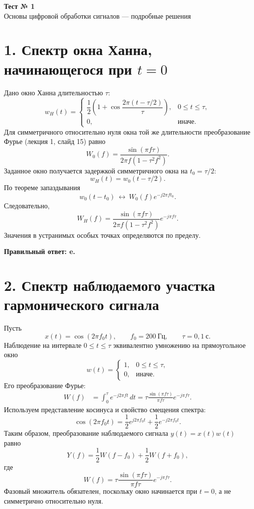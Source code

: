\documentclass[12pt,a4paper]{article}
\begin{document}
\begin{center}
{\Huge\bfseries Тест № 1}\\[8pt]
{\large Основы цифровой обработки сигналов — подробные решения}
\end{center}
\vspace{8mm}
\section*{1. Спектр окна Ханна, начинающегося при $t=0$}
Дано окно Ханна длительностью $\tau$:
\[
w_H(t)=\begin{cases}
\dfrac12\left(1+\cos\dfrac{2\pi(t-\tau/2)}{\tau}\right),&0\leq t\leq\tau,\\[5pt]
0,&\text{иначе}.
\end{cases}
\]
Для симметричного относительно нуля окна той же длительности преобразование Фурье (лекция 1, слайд 15) равно
\[
W_0(f)=\frac{\sin(\pi f\tau)}{2\pi f(1-\tau^2 f^2)}.
\]
Заданное окно получается задержкой симметричного окна на $t_0=\tau/2$:
\[
w_H(t)=w_0(t-\tau/2).
\]
По теореме запаздывания
\[
w_0(t-t_0)\ \longleftrightarrow\ W_0(f)e^{-j2\pi f t_0}.
\]
Следовательно,
\[
\boxed{W_H(f)=\frac{\sin(\pi f\tau)}{2\pi f(1-\tau^2f^2)}e^{-j\pi f\tau}.}
\]
Значения в устранимых особых точках определяются по пределу.

\noindent\textbf{Правильный ответ: e.}

\section*{2. Спектр наблюдаемого участка гармонического сигнала}
Пусть
\[
x(t)=\cos(2\pi f_0t),\qquad f_0=200\ \text{Гц},\qquad \tau=0{,}1\ \text{с}.
\]
Наблюдение на интервале $0\leq t\leq\tau$ эквивалентно умножению на прямоугольное окно
\[
w(t)=\begin{cases}1,&0\leq t\leq\tau,\\0,&\text{иначе}.\end{cases}
\]
Его преобразование Фурье:
\begin{align*}
W(f)&=\int_0^\tau e^{-j2\pi ft}\,dt
=\tau\frac{\sin(\pi f\tau)}{\pi f\tau}e^{-j\pi f\tau}.
\end{align*}
Используем представление косинуса и свойство смещения спектра:
\[
\cos(2\pi f_0t)=\frac12e^{j2\pi f_0t}+\frac12e^{-j2\pi f_0t}.
\]
Таким образом, преобразование наблюдаемого сигнала $y(t)=x(t)w(t)$ равно
\[
\boxed{Y(f)=\frac12W(f-f_0)+\frac12W(f+f_0),}
\]
где
\[
W(f)=\tau\frac{\sin(\pi f\tau)}{\pi f\tau}e^{-j\pi f\tau}.
\]
Фазовый множитель обязателен, поскольку окно начинается при $t=0$, а не симметрично относительно нуля.
\end{document}
